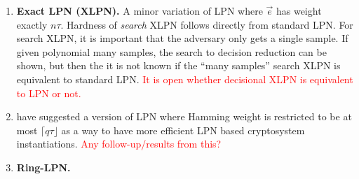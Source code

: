 \begin{enumerate}
	\item  \textbf{Exact LPN (XLPN).} A minor variation of LPN where $ \vec{e} $ has weight exactly $ n \tau $. 
	Hardness of \textit{search} XLPN follows directly from standard LPN.
	For search XLPN, it is important that the adversary only gets a single sample.
	If given polynomial many samples, the search to decision reduction can be shown, but then the it is not known if the ``many samples'' search XLPN is equivalent to standard LPN.
	\textcolor{red}{It is open whether decisional XLPN is equivalent to LPN or not.}
	
	\item \cite{JC:KatShiSmi10} have suggested a version of LPN where Hamming weight is restricted to be at most $\lceil q\tau \rfloor$ as a way to have more efficient LPN based cryptosystem instantiations.
	\textcolor{red}{Any follow-up/results from this?}
	
	\item \textbf{Ring-LPN.} 
	
\end{enumerate} 

